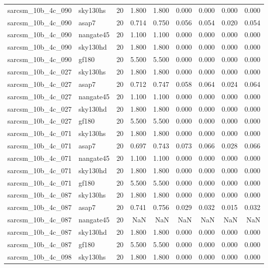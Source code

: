 \begin{tabular}{llrrrrrrr}
sarcsm\_10b\_4c\_090 & sky130hs & 20 & 1.800 & 1.800 & 0.000 & 0.000 & 0.000 & 0.000 \\
sarcsm\_10b\_4c\_090 & asap7 & 20 & 0.714 & 0.750 & 0.056 & 0.054 & 0.020 & 0.054 \\
sarcsm\_10b\_4c\_090 & nangate45 & 20 & 1.100 & 1.100 & 0.000 & 0.000 & 0.000 & 0.000 \\
sarcsm\_10b\_4c\_090 & sky130hd & 20 & 1.800 & 1.800 & 0.000 & 0.000 & 0.000 & 0.000 \\
sarcsm\_10b\_4c\_090 & gf180 & 20 & 5.500 & 5.500 & 0.000 & 0.000 & 0.000 & 0.000 \\
sarcsm\_10b\_4c\_027 & sky130hs & 20 & 1.800 & 1.800 & 0.000 & 0.000 & 0.000 & 0.000 \\
sarcsm\_10b\_4c\_027 & asap7 & 20 & 0.712 & 0.747 & 0.058 & 0.064 & 0.024 & 0.064 \\
sarcsm\_10b\_4c\_027 & nangate45 & 20 & 1.100 & 1.100 & 0.000 & 0.000 & 0.000 & 0.000 \\
sarcsm\_10b\_4c\_027 & sky130hd & 20 & 1.800 & 1.800 & 0.000 & 0.000 & 0.000 & 0.000 \\
sarcsm\_10b\_4c\_027 & gf180 & 20 & 5.500 & 5.500 & 0.000 & 0.000 & 0.000 & 0.000 \\
sarcsm\_10b\_4c\_071 & sky130hs & 20 & 1.800 & 1.800 & 0.000 & 0.000 & 0.000 & 0.000 \\
sarcsm\_10b\_4c\_071 & asap7 & 20 & 0.697 & 0.743 & 0.073 & 0.066 & 0.028 & 0.066 \\
sarcsm\_10b\_4c\_071 & nangate45 & 20 & 1.100 & 1.100 & 0.000 & 0.000 & 0.000 & 0.000 \\
sarcsm\_10b\_4c\_071 & sky130hd & 20 & 1.800 & 1.800 & 0.000 & 0.000 & 0.000 & 0.000 \\
sarcsm\_10b\_4c\_071 & gf180 & 20 & 5.500 & 5.500 & 0.000 & 0.000 & 0.000 & 0.000 \\
sarcsm\_10b\_4c\_087 & sky130hs & 20 & 1.800 & 1.800 & 0.000 & 0.000 & 0.000 & 0.000 \\
sarcsm\_10b\_4c\_087 & asap7 & 20 & 0.741 & 0.756 & 0.029 & 0.032 & 0.015 & 0.032 \\
sarcsm\_10b\_4c\_087 & nangate45 & 20 & NaN & NaN & NaN & NaN & NaN & NaN \\
sarcsm\_10b\_4c\_087 & sky130hd & 20 & 1.800 & 1.800 & 0.000 & 0.000 & 0.000 & 0.000 \\
sarcsm\_10b\_4c\_087 & gf180 & 20 & 5.500 & 5.500 & 0.000 & 0.000 & 0.000 & 0.000 \\
sarcsm\_10b\_4c\_098 & sky130hs & 20 & 1.800 & 1.800 & 0.000 & 0.000 & 0.000 & 0.000 \\

\end{tabular}
